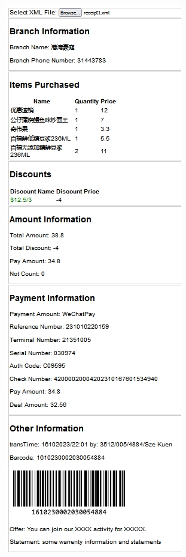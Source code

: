\documentclass[12pt]{amsart}
\begin{document}
\begin{figure}
  {\includegraphics[width=0.45\linewidth]{html1.png}}
\end{figure}
\end{document}
